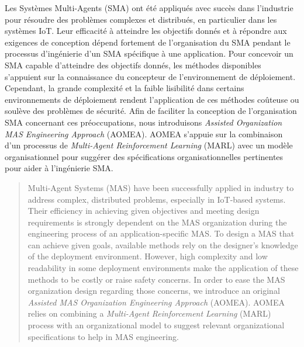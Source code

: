 \documentclass[contribution]{jfsma}
\begin{document}
\maketitle

\begin{resume}
  Les Systèmes Multi-Agents (SMA) ont été appliqués avec succès dans l'industrie pour résoudre des problèmes complexes et distribués, en particulier dans les systèmes IoT.
  Leur efficacité à atteindre les objectifs donnés et à répondre aux exigences de conception dépend fortement de l'organisation du SMA pendant le processus d'ingénierie d'un SMA spécifique à une application. Pour concevoir un SMA capable d'atteindre des objectifs donnés, les méthodes disponibles s'appuient sur la connaissance du concepteur de l'environnement de déploiement.
  Cependant, la grande complexité et la faible lisibilité dans certains environnements de déploiement rendent l’application de ces méthodes coûteuse ou soulève des problèmes de sécurité.
  Afin de faciliter la conception de l'organisation SMA concernant ces préoccupations, nous introduisons \emph{Assisted Organization MAS Engineering Approach} (AOMEA). AOMEA s'appuie sur la combinaison d'un processus de \emph{Multi-Agent Reinforcement Learning} (MARL) avec un modèle organisationnel pour suggérer des spécifications organisationnelles pertinentes pour aider à l'ingénierie SMA.
\end{resume}


\bigskip

\begin{abstract}
  Multi-Agent Systems (MAS) have been successfully applied in industry to address complex, distributed problems, especially in IoT-based systems.
  Their efficiency in achieving given objectives and meeting design requirements is strongly dependent on the MAS organization during the engineering process of an application-specific MAS. To design a MAS that can achieve given goals, available methods rely on the designer's knowledge of the deployment environment.
  However, high complexity and low readability in some deployment environments make the application of these methods to be costly or raise safety concerns.
  In order to ease the MAS organization design regarding those concerns, we introduce an original \emph{Assisted MAS Organization Engineering Approach} (AOMEA). AOMEA relies on combining a \emph{Multi-Agent Reinforcement Learning} (MARL) process with an organizational model to suggest relevant organizational specifications to help in MAS engineering.
\end{abstract}
\end{document}

